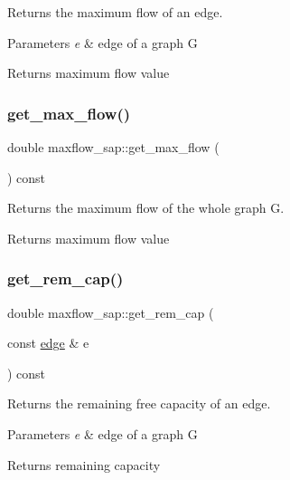 Returns the maximum flow of an edge.


\begin{DoxyParams}{Parameters}
{\em e} & edge of a graph {\ttfamily G} \\
\hline
\end{DoxyParams}
\begin{DoxyReturn}{Returns}
maximum flow value 
\end{DoxyReturn}
\mbox{\label{classmaxflow__sap_a81251d546cbdabc837f24fc3caf9fe0d}} 
\subsubsection{\texorpdfstring{get\+\_\+max\+\_\+flow()}{get\_max\_flow()}\hspace{0.1cm}{\footnotesize\ttfamily [2/2]}}
{\footnotesize\ttfamily double maxflow\+\_\+sap\+::get\+\_\+max\+\_\+flow (\begin{DoxyParamCaption}{ }\end{DoxyParamCaption}) const}

Returns the maximum flow of the whole graph G.

\begin{DoxyReturn}{Returns}
maximum flow value 
\end{DoxyReturn}
\mbox{\label{classmaxflow__sap_a634835664542d5d181e1b63b99dda36c}} 
\subsubsection{\texorpdfstring{get\+\_\+rem\+\_\+cap()}{get\_rem\_cap()}}
{\footnotesize\ttfamily double maxflow\+\_\+sap\+::get\+\_\+rem\+\_\+cap (\begin{DoxyParamCaption}\item[{const \mbox{\hyperlink{classedge}{edge}} \&}]{e }\end{DoxyParamCaption}) const}

Returns the remaining free capacity of an edge.


\begin{DoxyParams}{Parameters}
{\em e} & edge of a graph {\ttfamily G} \\
\hline
\end{DoxyParams}
\begin{DoxyReturn}{Returns}
remaining capacity 
\end{DoxyReturn}
\mbox{\label{classmaxflow__sap_a66cd0fdc3d4372c26c282129e9275894}} 
